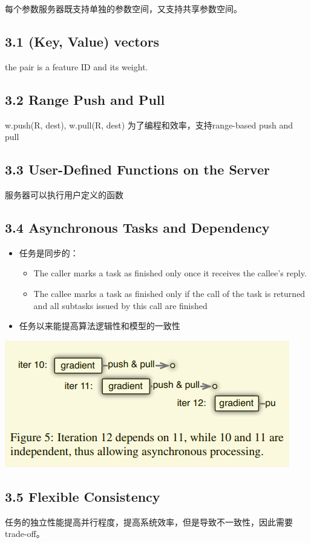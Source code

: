 \documentclass[11pt]{article}
\begin{document}
每个参数服务器既支持单独的参数空间，又支持共享参数空间。
\subsection{3.1 (Key, Value) vectors}
\label{sec:orgfd9b2f1}
the pair is a feature ID and its weight.
\subsection{3.2 Range Push and Pull}
\label{sec:org1feb1c5}
w.push(R, dest), w.pull(R, dest) 为了编程和效率，支持range-based push and pull
\subsection{3.3 User-Defined Functions on the Server}
\label{sec:orgb613783}
服务器可以执行用户定义的函数
\subsection{3.4 Asynchronous Tasks and Dependency}
\label{sec:orgbe811c7}
\begin{itemize}
\item 任务是同步的：
\begin{itemize}
\item The caller marks a task as finished only once it receives the callee’s reply.
\item The callee marks a task as finished only if the call of the task is returned and all subtasks issued by this call are finished
\end{itemize}
\item 任务以来能提高算法逻辑性和模型的一致性
\end{itemize}
\begin{center}
\includegraphics[width=.9\linewidth]{PS.org_imgs/20201110_184541_yCmmwR.png}
\end{center} 

\subsection{3.5 Flexible Consistency}
\label{sec:org1222424}
任务的独立性能提高并行程度，提高系统效率，但是导致不一致性，因此需要trade-off。
\end{document}
